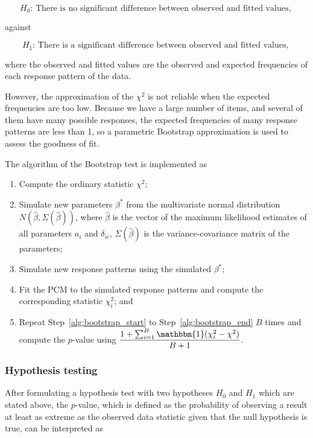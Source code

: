 \documentclass[a4paper]{report}
\begin{document}
$$H_0 \text{: There is no significant difference between observed and fitted values, }$$

\noindent
against

$$H_1 \text{: There is a significant difference between observed and fitted values, }$$

\noindent
where the observed and fitted values are the observed and expected frequencies of each response pattern of the data. 

However, the approximation of the $\chi^2$ is not reliable when the expected frequencies are too low. Because we have a large number of items, and several of them have many possible responses, the expected frequencies of many response patterns are less than 1, so a parametric Bootstrap approximation is used to assess the goodness of fit. 

The algorithm of the Bootstrap test \cite{ltm} is implemented as 

\begin{enumerate}[Step 1]
\item Compute the ordinary statistic $\chi^2$; 
\item \label{alg:bootstrap_start}Simulate new parameters $\beta^*$ from the multivariate normal distribution $N(\hat\beta, \Sigma(\hat\beta))$, where $\hat\beta$ is the vector of the maximum likelihood estimates of all parameters $a_i$ and $\delta_{ic}$, $\Sigma(\hat\beta)$ is the variance-covariance matrix of the parameters; 
\item Simulate new response patterns using the simulated $\beta^*$; 
\item \label{alg:bootstrap_end}Fit the PCM to the simulated response patterns and compute the corresponding statistic $\chi^2_{i}$; and
\item Repeat Step~\ref{alg:bootstrap_start} to Step~\ref{alg:bootstrap_end} $B$ times and compute the $p$-value using $\displaystyle \frac{1 + \sum_{i=1}^B \mathbbm{1}(\chi^2_{i} - \chi^2)}{B+1}$. 
\end{enumerate}

\subsubsection{Hypothesis testing}

After formulating a hypothesis test with two hypotheses $H_0$ and $H_1$ which are stated above, the $p$-value, which is defined as the probability of observing a result at least as extreme as the observed data statistic given that the null hypothesis is true, can be interpreted as \cite{statsyr2} 
\end{document}
